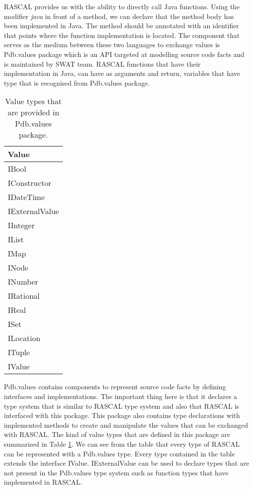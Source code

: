 RASCAL provides us with the ability to directly call Java functions. Using the modifier \textsl{java} in front of a method, we can declare that the method body has been implemented in Java. The method should be annotated with an identifier that points where the function implementation is located. The component that serves as the medium between these two languages to exchange values is Pdb.values package\cite{pdbdoc} which is an API targeted at modelling source code facts and  is maintained by SWAT team. RASCAL functions that have their implementation in Java, can have as arguments and return, variables that have type that is recognised from Pdb.values package.


\begin{table}[h]
\centering
\begin{tabular}{l}
\hline \textbf{Value}\\ \hline
IBool\\
IConstructor\\
IDateTime\\
IExternalValue\\
IInteger\\
IList\\
IMap\\
INode\\
INumber\\
IRational\\
IReal\\
ISet\\
ILocation\\
ITuple\\
IValue\\\hline
\end{tabular}
\label{tbl:Pdbvalues}
\caption{Value types that are provided in Pdb.values package.}
\end{table}

Pdb.values contains components to represent source code facts by defining interfaces and implementations. The important thing here is that it declares a type system that is similar to RASCAL type system and also that RASCAL is interfaced with this package. This package also contains type declarations with implemented methods to create and manipulate the values that can be exchanged with RASCAL. The kind of value types that are defined in this package are summarised in Table \ref{tbl:Pdbvalues}. We can see from the table that every type of RASCAL can be represented with a Pdb.values type. Every type contained in the table extends the interface IValue. IExternalValue can be used to declare types that are not present in the Pdb.values type system such as function types that have implemented in RASCAL.

